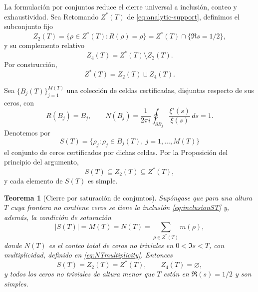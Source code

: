 \documentclass[11pt]{amsart}
\newtheorem{theorem}{Teorema}[section]
\theoremstyle{definition}
\theoremstyle{remark}
\begin{document}
La formulación por conjuntos reduce el cierre universal a inclusión, conteo y exhaustividad. Sea
Retomando $Z^*(T)$ de \eqref{eq:analytic-support}, definimos el subconjunto fijo
\begin{equation}\label{eq:Z2T}
 Z_2(T)=\{\rho\in Z^*(T):R(\rho)=\rho\}
       =Z^*(T)\cap\{\Re s=1/2\},
\end{equation}
y su complemento relativo
\begin{equation}\label{eq:Z4T}
 Z_4(T)=Z^*(T)\setminus Z_2(T).
\end{equation}
Por construcción,
\begin{equation}\label{eq:partitionT}
 Z^*(T)=Z_2(T)\sqcup Z_4(T).
\end{equation}

Sea $\{B_j(T)\}_{j=1}^{M(T)}$ una colección de celdas certificadas, disjuntas respecto de sus ceros, con
\begin{equation}\label{eq:cellcertT}
 R(B_j)=B_j,\qquad
 N(B_j)=\frac{1}{2\pi i}\oint_{\partial B_j}\frac{\xi'(s)}{\xi(s)}\,ds=1.
\end{equation}
Denotemos por
\begin{equation}\label{eq:ST}
 S(T)=\{\rho_j:\rho_j\in B_j(T),\ j=1,\ldots,M(T)\}
\end{equation}
el conjunto de ceros certificados por dichas celdas. Por la Proposición del principio del argumento,
\begin{equation}\label{eq:inclusionST}
 S(T)\subseteq Z_2(T)\subseteq Z^*(T),
\end{equation}
y cada elemento de $S(T)$ es simple.

\begin{theorem}[Cierre por saturación de conjuntos]\label{thm:saturation}
Supóngase que para una altura $T$ cuya frontera no contiene ceros se tiene la inclusión \eqref{eq:inclusionST} y, además, la condición de saturación
\begin{equation}\label{eq:saturationcount}
 |S(T)|=M(T)=N(T)=\sum_{\rho\in Z^*(T)}m(\rho),
\end{equation}
donde $N(T)$ es el conteo total de ceros no triviales en $0<\Im s<T$, con multiplicidad, definido en \eqref{eq:NTmultiplicity}. Entonces
\begin{equation}\label{eq:saturationequality}
 S(T)=Z_2(T)=Z^*(T),\qquad Z_4(T)=\varnothing,
\end{equation}
y todos los ceros no triviales de altura menor que $T$ están en $\Re(s)=1/2$ y son simples.
\end{theorem}
\end{document}
